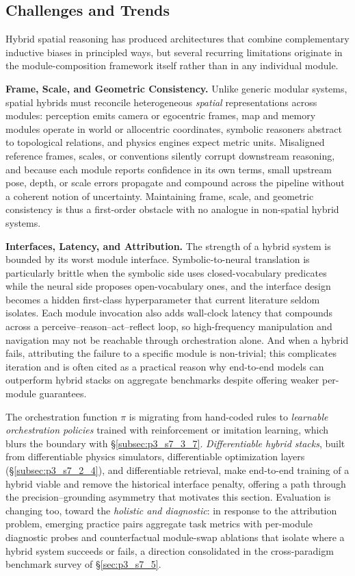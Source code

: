 \subsection{Challenges and Trends}
\label{subsec:p3-sec7-4-challenges-and-trends}
Hybrid spatial reasoning has produced architectures that combine complementary inductive biases in principled ways, but several recurring limitations originate in the module-composition framework itself rather than in any individual module.

\textbf{Frame, Scale, and Geometric Consistency.}
Unlike generic modular systems, spatial hybrids must reconcile heterogeneous \emph{spatial} representations across modules: perception emits camera or egocentric frames, map and memory modules operate in world or allocentric coordinates, symbolic reasoners abstract to topological relations, and physics engines expect metric units. Misaligned reference frames, scales, or conventions silently corrupt downstream reasoning, and because each module reports confidence in its own terms, small upstream pose, depth, or scale errors propagate and compound across the pipeline without a coherent notion of uncertainty. Maintaining frame, scale, and geometric consistency is thus a first-order obstacle with no analogue in non-spatial hybrid systems.

\textbf{Interfaces, Latency, and Attribution.}
The strength of a hybrid system is bounded by its worst module interface. Symbolic-to-neural translation is particularly brittle when the symbolic side uses closed-vocabulary predicates while the neural side proposes open-vocabulary ones, and the interface design becomes a hidden first-class hyperparameter that current literature seldom isolates. Each module invocation also adds wall-clock latency that compounds across a perceive--reason--act--reflect loop, so high-frequency manipulation and navigation may not be reachable through orchestration alone. And when a hybrid fails, attributing the failure to a specific module is non-trivial; this complicates iteration and is often cited as a practical reason why end-to-end models can outperform hybrid stacks on aggregate benchmarks despite offering weaker per-module guarantees.

The orchestration function $\pi$ is migrating from hand-coded rules to \emph{learnable orchestration policies} trained with reinforcement or imitation learning, which blurs the boundary with §\ref{subsec:p3_s7_3_7}.
\emph{Differentiable hybrid stacks}, built from differentiable physics simulators, differentiable optimization layers (§\ref{subsec:p3_s7_2_4}), and differentiable retrieval, make end-to-end training of a hybrid viable and remove the historical interface penalty, offering a path through the precision--grounding asymmetry that motivates this section.
Evaluation is changing too, toward the \emph{holistic and diagnostic}: in response to the attribution problem, emerging practice pairs aggregate task metrics with per-module diagnostic probes and counterfactual module-swap ablations that isolate where a hybrid system succeeds or fails, a direction consolidated in the cross-paradigm benchmark survey of §\ref{sec:p3_s7_5}.
